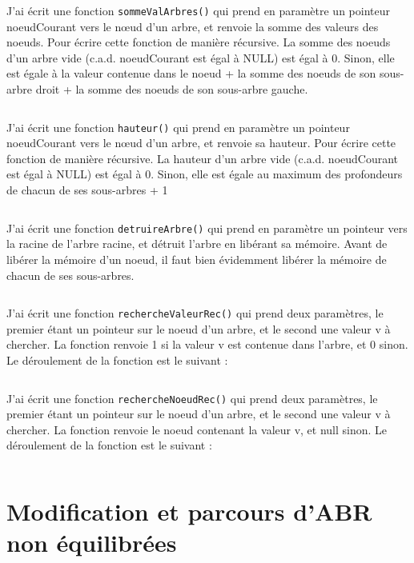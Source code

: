 J'ai écrit une fonction \texttt{sommeValArbres()} qui prend en paramètre un pointeur noeudCourant vers le nœud d’un arbre, et renvoie la somme des valeurs des noeuds. Pour écrire cette fonction de manière récursive. La somme des noeuds d’un arbre vide (c.a.d. noeudCourant est égal à NULL) est égal à 0. Sinon, elle est égale à la valeur contenue dans le noeud + la somme des noeuds de son sous-arbre droit + la somme des noeuds de son sous-arbre gauche.
\inputminted[linenos,firstline=18,lastline=22]{cpp}{../sources/cpp/TP3-4/arbresFctRecursives.c}

J'ai écrit une fonction \texttt{hauteur()} qui prend en paramètre un pointeur noeudCourant vers le nœud d’un arbre, et renvoie sa hauteur. Pour écrire cette fonction de manière récursive. La hauteur d’un arbre vide (c.a.d. noeudCourant est égal à NULL) est égal à 0. Sinon, elle est égale au maximum des profondeurs de chacun de ses sous-arbres + 1
\inputminted[linenos,firstline=24,lastline=28]{cpp}{../sources/cpp/TP3-4/arbresFctRecursives.c}

J'ai écrit une fonction \texttt{detruireArbre()} qui prend en paramètre un pointeur vers la racine de l’arbre racine, et détruit l’arbre en libérant sa mémoire. Avant de libérer la mémoire d’un noeud, il faut bien évidemment libérer la mémoire de chacun de ses sous-arbres.
\inputminted[linenos,firstline=30,lastline=36]{cpp}{../sources/cpp/TP3-4/arbresFctRecursives.c}

J'ai écrit une fonction \texttt{rechercheValeurRec()} qui prend deux paramètres, le premier étant un pointeur sur le noeud d'un arbre, et le second une valeur v à chercher. La fonction renvoie 1 si la valeur v est contenue dans l’arbre, et 0 sinon. Le déroulement de la fonction est le suivant :
\inputminted[linenos,firstline=38,lastline=42]{cpp}{../sources/cpp/TP3-4/arbresFctRecursives.c}

J'ai écrit une fonction \texttt{rechercheNoeudRec()} qui prend deux paramètres, le premier étant un pointeur sur  le noeud d'un arbre, et le second une valeur v à chercher. La fonction renvoie le noeud contenant la valeur v, et null sinon. Le déroulement de la fonction est le suivant :
\inputminted[linenos,firstline=44,lastline=57]{cpp}{../sources/cpp/TP3-4/arbresFctRecursives.c}

\section{Modification et parcours d’ABR non équilibrées}

